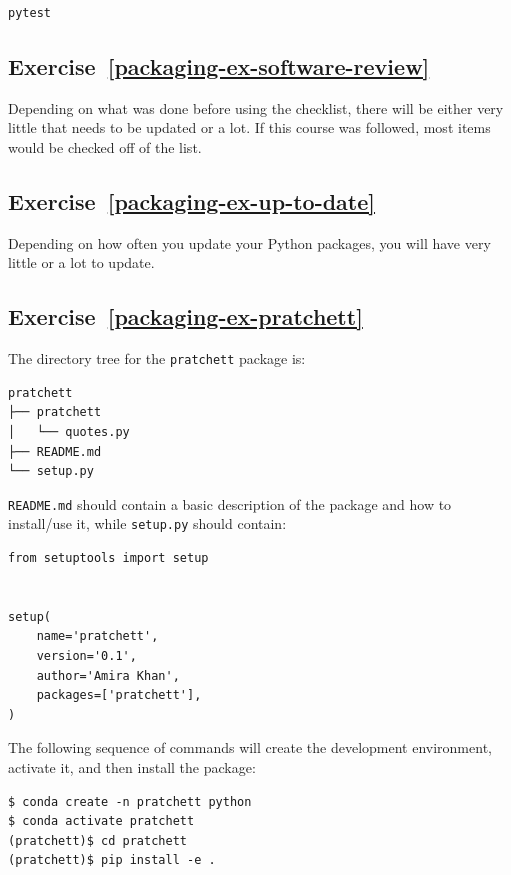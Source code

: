\documentclass[
]{krantz}
\begin{document}
\begin{verbatim}
pytest
\end{verbatim}

\hypertarget{exercise-refpackaging-ex-software-review}{%
\subsection*{Exercise~\ref{packaging-ex-software-review}}\label{exercise-refpackaging-ex-software-review}}


Depending on what was done before using the checklist, there will be either
very little that needs to be updated or a lot. If this course was followed,
most items would be checked off of the list.

\hypertarget{exercise-refpackaging-ex-up-to-date}{%
\subsection*{Exercise~\ref{packaging-ex-up-to-date}}\label{exercise-refpackaging-ex-up-to-date}}


Depending on how often you update your Python packages, you will have very little
or a lot to update.

\hypertarget{exercise-refpackaging-ex-pratchett}{%
\subsection*{Exercise~\ref{packaging-ex-pratchett}}\label{exercise-refpackaging-ex-pratchett}}


The directory tree for the \texttt{pratchett} package is:

\begin{verbatim}
pratchett
├── pratchett
│   └── quotes.py
├── README.md
└── setup.py
\end{verbatim}

\texttt{README.md} should contain a basic description of the package and how to install/use it,
while \texttt{setup.py} should contain:

\begin{verbatim}
from setuptools import setup


setup(
    name='pratchett',
    version='0.1',
    author='Amira Khan',
    packages=['pratchett'],
)
\end{verbatim}

The following sequence of commands will create the development environment,
activate it,
and then install the package:

\begin{verbatim}
$ conda create -n pratchett python
$ conda activate pratchett
(pratchett)$ cd pratchett
(pratchett)$ pip install -e .
\end{verbatim}
\end{document}

